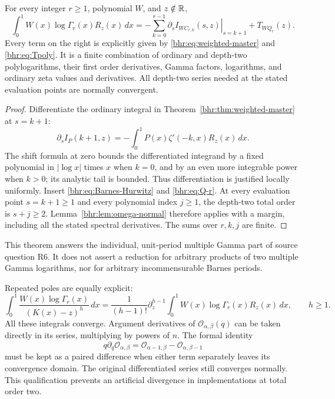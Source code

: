 \begin{theorem}\label{bhr:thm:all-Barnes}
For every integer $r\ge1$, polynomial $W$, and $z\notin\mathbb R$,
\begin{equation}\label{bhr:eq:all-Barnes}
 \boxed{\displaystyle
 \int_0^1 W(x)\log\Gamma_r(x)R_z(x)\,dx
  =-\sum_{k=0}^{r-1}
      \left.\partial_s I_{W C_{r,k}}(s,z)\right|_{s=k+1}
          +T_{WQ_r}(z).}
\end{equation}
Every term on the right is explicitly given by
\eqref{bhr:eq:weighted-master} and \eqref{bhr:eq:Tpoly}. It is a finite
combination of ordinary and depth-two polylogarithms, their first
order derivatives, Gamma factors, logarithms, and ordinary zeta
values and derivatives. All depth-two series needed at the stated
evaluation points are normally convergent.
\end{theorem}

\begin{proof}
Differentiate the ordinary integral in
Theorem~\ref{bhr:thm:weighted-master} at $s=k+1$:
\[
 \partial_s I_P(k+1,z)
       =-\int_0^1P(x)\zeta'(-k,x)R_z(x)\,dx.
\]
The shift formula at zero bounds the differentiated integrand by
a fixed polynomial in $|\log x|$ times $x$ when $k=0$, and
by an even more integrable power when $k>0$; its analytic tail
is bounded. Thus differentiation is justified locally uniformly.
Insert \eqref{bhr:eq:Barnes-Hurwitz} and \eqref{bhr:eq:Q-r}.
At every evaluation point $s=k+1\ge1$ and every polynomial
index $j\ge1$, the depth-two total order is $s+j\ge2$.
Lemma~\ref{bhr:lem:omega-normal} therefore applies with a margin,
including all the stated spectral derivatives. The sums over
$r,k,j$ are finite.
\end{proof}

This theorem answers the individual, unit-period multiple Gamma
part of source question R6. It does not assert a reduction for
arbitrary products of two multiple Gamma logarithms, nor for
arbitrary incommensurable Barnes periods.

Repeated poles are equally explicit:
\begin{equation}\label{bhr:eq:Barnes-repeated}
 \int_0^1\frac{W(x)\log\Gamma_r(x)}{(K(x)-z)^h}\,dx
   =\frac1{(h-1)!}\partial_z^{h-1}
      \int_0^1W(x)\log\Gamma_r(x)R_z(x)\,dx,
 \qquad h\ge1.
\end{equation}
All these integrals converge. Argument derivatives of
$\mathcal O_{\alpha,\beta}(q)$ can be taken directly in its
series, multiplying by powers of $n$. The formal identity
\[
 q\partial_q\mathcal O_{\alpha,\beta}
  =\mathcal O_{\alpha-1,\beta}-\mathcal O_{\alpha,\beta-1}
\]
must be kept as a paired difference when either term separately
leaves its convergence domain. The original differentiated series
still converges normally. This qualification prevents an artificial
divergence in implementations at total order two.

